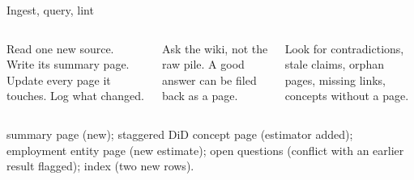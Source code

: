 \begin{frame}{Ingest, query, lint}
  \begin{columns}[T,onlytextwidth]
      {\small Read one new source. Write its summary page. Update every page it touches. Log what changed.\par}
      {\small Ask the wiki, not the raw pile. A good answer can be filed back as a page.\par}
      {\small Look for contradictions, stale claims, orphan pages, missing links, concepts without a page.\par}
  \end{columns}
  \vspace{0.45em}
  \begin{center}
  \end{center}
  \vspace{0.35em}
  {\small summary page (new); staggered DiD concept page (estimator added); employment entity page (new estimate); open questions (conflict with an earlier result flagged); index (two new rows).\par}
\end{frame}

